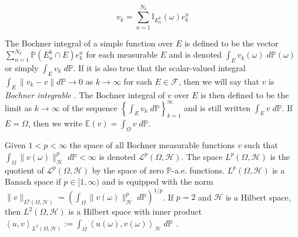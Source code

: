 \documentclass{article}
\numberwithin{theorem}{section}
\numberwithin{lemma}{section}
\newtheorem{definition}{Definition}
\numberwithin{definition}{section}
\numberwithin{assumption}{section}
\numberwithin{proposition}{section}
\numberwithin{remark}{section}
\numberwithin{corollary}{section}
\numberwithin{conjecture}{section}
\numberwithin{example}{section}
\newcommand{\E}{\mathbb{E}}
\newcommand{\bset}[1]{\left \lbrace #1 \right \rbrace}
\newcommand{\aset}[1]{\left \langle #1 \right \rangle}
\newcommand{\CH}{\mathcal H}
\begin{document}
\begin{multicols*}{2}
$$v_k = \sum_{n = 1}^{N_k} \mathbb I_{E^k_n}(\omega)e^n_k$$

The Bochner integral of a simple function over $E$ is defined to be the vector $\sum_{n = 1}^{N_k} \mathbb P(E^k_n \cap E)e^n_k$ for each measurable $E$ and is denoted $\int_E v_k(\omega) \; d \mathbb P(\omega)$ or simply $\int_E v_k \; d \mathbb P$. If it is also true that the scalar-valued integral $\int_E \|v_k - v\| d \mathbb P \to 0$ as $k \to \infty$ for each $E \in \mathcal F$, then we will say that $v$ is \textit{Bochner integrable} \cite{DiestelUhl1977}. The Bochner integral of $v$ over $E$ is then defined to be the limit as $k \to \infty$ of the sequence $\bset{ \int_E v_k \; d \mathbb P}_{k=1}^\infty$ \cite{DiestelUhl1977} and is still written $ \int_E v \; d \mathbb P$. If $E = \Omega$, then we write $\E(v) = \int_\Omega v \; d \mathbb P$. 

Given $1 < p < \infty$ the space of all Bochner measurable functions $v$ such that $\int_\Omega \|v(\omega)\|^p_\mathcal H \; d \mathbb P < \infty$ is denoted $\mathcal L^p(\Omega, \mathcal H)$. The space $L^p(\Omega, \mathcal H)$ is the quotient of $\mathcal L^p(\Omega, \mathcal H)$ by the space of zero $\mathbb P$-a.e. functions. $L^p(\Omega, \mathcal H)$ is a Banach space if $p \in [1, \infty)$ and is equipped with the norm $ \|v\|_{L^p(\Omega, \mathcal H)} = \left(\int_\Omega \|v(\omega)\|^p_\mathcal H \; d \mathbb P \right)^{1/p}$. If $p = 2$ and $\CH$ is a Hilbert space, then $L^2(\Omega, \mathcal H)$ is a Hilbert space with inner product $\aset{u,v}_{L^2(\Omega, \mathcal H)} := \int_\Omega \aset{u(\omega), v(\omega)}_{\mathcal H} \; d \mathbb P$ \cite{DiestelUhl1977}.









\end{multicols*}
\end{document}
